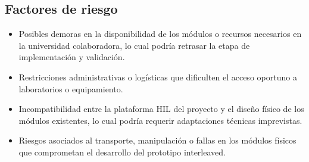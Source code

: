 \subsection{Factores de riesgo}

\begin{itemize}
  \item Posibles demoras en la disponibilidad de los módulos o recursos necesarios en la universidad colaboradora, lo cual podría retrasar la etapa de implementación y validación.
  \item Restricciones administrativas o logísticas que dificulten el acceso oportuno a laboratorios o equipamiento.
  \item Incompatibilidad entre la plataforma HIL del proyecto y el diseño físico de los módulos existentes, lo cual podría requerir adaptaciones técnicas imprevistas.
  \item Riesgos asociados al transporte, manipulación o fallas en los módulos físicos que comprometan el desarrollo del prototipo interleaved.
\end{itemize}

